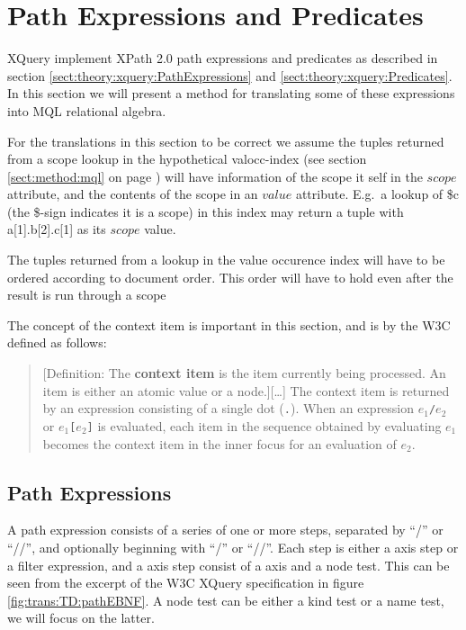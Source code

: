 \section{Path Expressions and Predicates}
\label{sect:trans:TD:pathNpred}

XQuery implement XPath 2.0 path expressions and predicates as described in section
\ref{sect:theory:xquery:PathExpressions} and \ref{sect:theory:xquery:Predicates}. In this section we will present
a method for translating some of these expressions into MQL relational algebra.

For the translations in this section to be correct we assume the tuples returned from a scope lookup in the
hypothetical \textsf{valocc}-index (see section \ref{sect:method:mql} on page \pageref{sect:method:mql}) will have
information of the scope it self in the $scope$ attribute, and the contents of the scope in an $value$ attribute.
E.g.\ a lookup of \textsf{\$c} (the \textsf{\$}-sign indicates it is a scope) in this index may return a tuple
with \textsf{a[1].b[2].c[1]} as its $scope$ value.

The tuples returned from a lookup in the value occurence index will have to be ordered according to document
order. This order will have to hold even after the result is run through a \textsf{scope}

The concept of the context item is important in this section, and is by the W3C defined as follows\cite{w3c00}:
\begin{quote}
[Definition: The \textbf{context item} is the item currently being processed. An item is either an atomic value or
a node.][\ldots] The context item is returned by an expression consisting of a single dot (\texttt{.}). When an
expression $e_1$\texttt{/}$e_2$ or $e_1$\texttt{[}$e_2$\texttt{]} is evaluated, each item in the sequence obtained
by evaluating $e_1$ becomes the context item in the inner focus for an evaluation of $e_2$.
\end{quote}

\subsection{Path Expressions}
\label{sect:trans:TD:pathExprs}
A path expression consists of a series of one or more steps, separated by ``/'' or ``//'', and optionally beginning
with ``/'' or ``//''.  Each step is either a axis step or a filter expression, and a axis step consist of a axis
and a node test. This can be seen from the excerpt of the W3C XQuery
specification in figure \ref{fig:trans:TD:pathEBNF}. A node test can be either a kind test or a name test, we will focus on the latter. 

